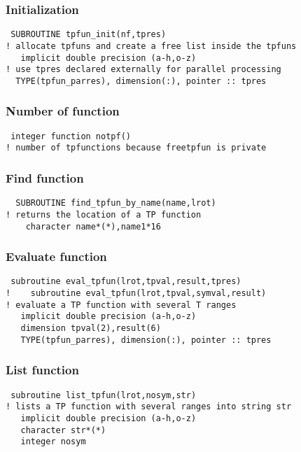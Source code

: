\documentclass[12pt]{article}
\begin{document}
\subsubsection{Initialization}

\begin{verbatim}
 SUBROUTINE tpfun_init(nf,tpres)
! allocate tpfuns and create a free list inside the tpfuns
   implicit double precision (a-h,o-z)
! use tpres declared externally for parallel processing
  TYPE(tpfun_parres), dimension(:), pointer :: tpres
\end{verbatim}

\subsubsection{Number of function}

\begin{verbatim}
 integer function notpf()
! number of tpfunctions because freetpfun is private
\end{verbatim}

\subsubsection{Find function}

\begin{verbatim}
  SUBROUTINE find_tpfun_by_name(name,lrot)
! returns the location of a TP function
    character name*(*),name1*16
\end{verbatim}

\subsubsection{Evaluate function}

\begin{verbatim}
 subroutine eval_tpfun(lrot,tpval,result,tpres)
!    subroutine eval_tpfun(lrot,tpval,symval,result)
! evaluate a TP function with several T ranges
   implicit double precision (a-h,o-z)
   dimension tpval(2),result(6)
   TYPE(tpfun_parres), dimension(:), pointer :: tpres
\end{verbatim}

\subsubsection{List function}

\begin{verbatim}
 subroutine list_tpfun(lrot,nosym,str)
! lists a TP function with several ranges into string str
   implicit double precision (a-h,o-z)
   character str*(*)
   integer nosym
\end{verbatim}
\end{document}

